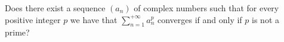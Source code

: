Does there exist a sequence \((a_n)\) of complex numbers such that for every positive integer \(p\) we have that \(\sum_{n=1}^{+\infty} a_n^p\) converges if and only if \(p\) is not a prime?

